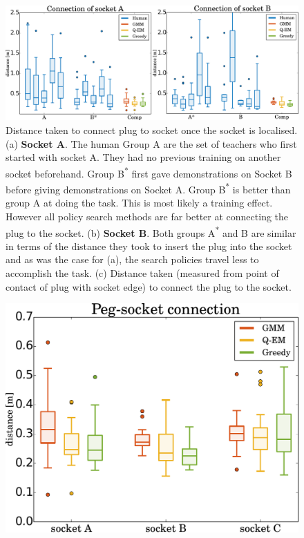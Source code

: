 \begin{figure}
 \centering
   \includegraphics[width=\textwidth]{./ch4-PiH/Figures/Results2/real_exp_socketAB.pdf}
  \caption{Distance taken to connect plug to socket once the socket is localised. (a) \textbf{Socket A}. The human 
  Group A are the set of teachers who first started with socket A. They had no previous training on another socket beforehand. Group 
  B\textsuperscript{*} first gave demonstrations on Socket B before giving demonstrations on Socket A. Group B\textsuperscript{*}
  is better than group A at doing the task. This is most likely a training effect. However all policy search methods are far better
  at connecting the plug to the socket. (b) \textbf{Socket B}. Both groups A\textsuperscript{*} and B are similar in terms 
  of the distance they took to insert the plug into the socket and as was the case for (a), the search policies travel less to accomplish 
  the task. (c) Distance taken (measured from point of contact of plug with socket edge) to connect the plug to the socket.  } 
  \label{fig:real_statistics}
\end{figure}

\begin{figure}
 \centering
   \includegraphics[width=\textwidth]{./ch4-PiH/Figures/Results2/peg_socket_connection_v2.pdf}
   \caption{}
  \label{fig:real_statistics2}
\end{figure}

